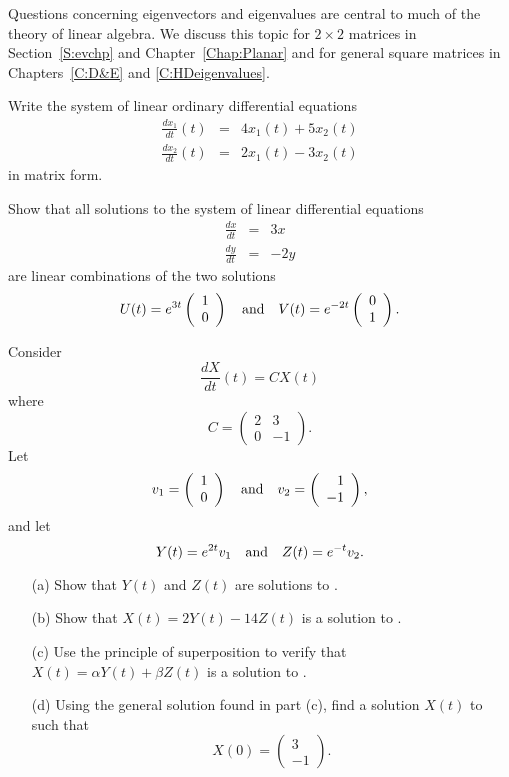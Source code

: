 \documentclass{ximera}
\begin{document}
Questions concerning eigenvectors and eigenvalues are central to
much of the theory of linear algebra.  We discuss this
topic for $2\times 2$ matrices in Section~\ref{S:evchp} and
Chapter~\ref{Chap:Planar} and for general square matrices in
Chapters~\ref{C:D&E} and \ref{C:HDeigenvalues}.

\EXER

\TEXER

\begin{exercise} \label{c4.1.5}
Write the system of linear ordinary differential equations
\begin{eqnarray*}
\frac{dx_1}{dt}(t) & = & 4x_1(t) + 5x_2(t) \\
\frac{dx_2}{dt}(t) & = & 2x_1(t) - 3x_2(t)
\end{eqnarray*}
in matrix form.
\end{exercise}

\begin{exercise} \label{c4.4.4}
Show that all solutions to the system of linear differential equations
\begin{eqnarray*}
\frac{dx}{dt} & = & 3x \\
\frac{dy}{dt} & = & -2y
\end{eqnarray*}
are linear combinations of the two solutions
\[
U(t) = e^{3t}\left(\begin{array}{r} 1 \\ 0\end{array}\right) \quad\mbox{and}\quad V(t) = e^{-2t}\left(\begin{array}{r} 0 \\ 1\end{array}\right).
\]
\end{exercise}

\begin{exercise} \label{c4.5.1}
Consider
\begin{equation}  \label{e:Ceqn}
\frac{dX}{dt}(t) = CX(t)
\end{equation}
where
\[
C=\left(\begin{array}{cr} 2 & 3\\0& -1 \end{array}\right).
\]
Let
\[
v_1=\left(\begin{array}{c} 1\\0\end{array}\right)\quad\mbox{and}\quad
v_2=\left(\begin{array}{r} 1\\-1\end{array}\right),
\]
and let
\[
Y(t)=e^{2t} v_1 \quad\mbox{and}\quad Z(t)=e^{-t}v_2.
\]
\begin{itemize}
\item[(a)] Show that $Y(t)$ and $Z(t)$ are solutions to .
\item[(b)] Show that $X(t)=2Y(t)-14Z(t)$ is a solution to .
\item[(c)] Use the principle of superposition to verify that
$X(t)=\alpha Y(t) + \beta Z(t)$ is a solution to .
\item[(d)] Using the general solution found in part (c), find a solution
$X(t)$ to  such that
\[
X(0) = \left(\begin{array}{r} 3\\-1\end{array}\right).
\]
\end{itemize}
\end{exercise}
\end{document}
